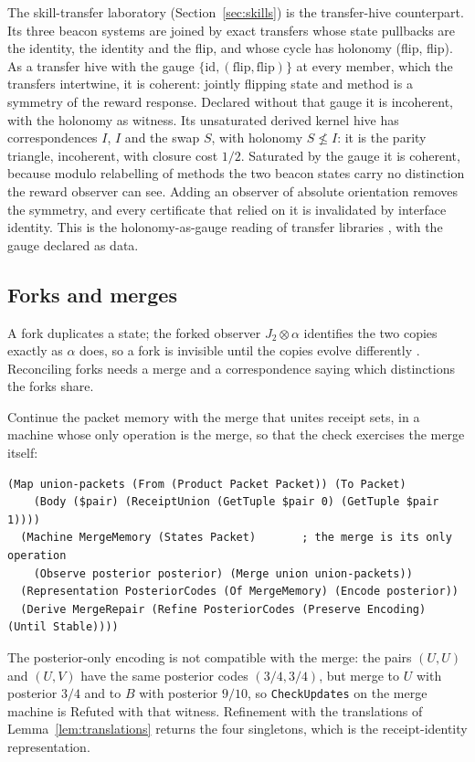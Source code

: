 \documentclass[11pt]{article}
\newcommand{\code}[1]{\texttt{#1}}
\theoremstyle{definition}
\theoremstyle{plain}
\begin{document}
The skill-transfer laboratory (Section~\ref{sec:skills}) is the transfer-hive counterpart. Its
three beacon systems are joined by exact transfers whose state pullbacks are the identity, the
identity and the flip, and whose cycle has holonomy (flip, flip). As a transfer hive with the gauge
$\{\mathrm{id},(\mathrm{flip},\mathrm{flip})\}$ at every member, which the transfers intertwine, it is
coherent: jointly flipping state and method is a
symmetry of the reward response. Declared without that gauge it is incoherent, with the holonomy as
witness. Its unsaturated derived kernel hive has correspondences $I$, $I$ and the swap $S$, with
holonomy $S\not\le I$: it is the parity triangle, incoherent, with closure cost $1/2$. Saturated by
the gauge it is coherent, because modulo relabelling of methods the two beacon states carry no
distinction the reward observer can see. Adding an observer of absolute orientation removes the
symmetry, and every certificate that relied on it is invalidated by interface identity. This is the
holonomy-as-gauge reading of transfer libraries \cite{transferhives}, with the gauge declared as
data.

\subsection{Forks and merges}\label{sec:forks}

A fork duplicates a state; the forked observer $J_2\otimes\alpha$ identifies the two copies exactly
as $\alpha$ does, so a fork is invisible until the copies evolve differently \cite{dclosure}.
Reconciling forks needs a merge and a correspondence saying which distinctions the forks share.

Continue the packet memory with the merge that unites receipt sets, in a machine whose only
operation is the merge, so that the check exercises the merge itself:
\begin{lstlisting}[basicstyle=\ttfamily\footnotesize,title={\scriptsize\ttfamily fixtures/receipt\_packets.metta}]
  (Map union-packets (From (Product Packet Packet)) (To Packet)
    (Body ($pair) (ReceiptUnion (GetTuple $pair 0) (GetTuple $pair 1))))
  (Machine MergeMemory (States Packet)       ; the merge is its only operation
    (Observe posterior posterior) (Merge union union-packets))
  (Representation PosteriorCodes (Of MergeMemory) (Encode posterior))
  (Derive MergeRepair (Refine PosteriorCodes (Preserve Encoding) (Until Stable))))
\end{lstlisting}
The posterior-only encoding is not compatible with the merge: the pairs $(U,U)$ and $(U,V)$ have
the same posterior codes $(3/4,3/4)$, but merge to $U$ with posterior $3/4$ and to $B$ with posterior
$9/10$, so \code{CheckUpdates} on the merge machine is Refuted with that witness. Refinement with the
translations of Lemma~\ref{lem:translations} returns the four singletons, which is the
receipt-identity representation.
\end{document}
